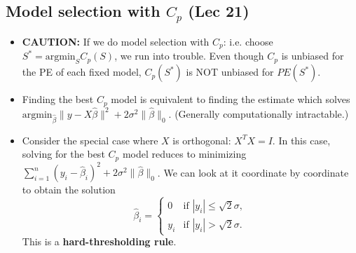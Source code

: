 \documentclass[twoside]{article}
\newcommand\dis{\displaystyle}
\newcommand\sg{\sigma}
\begin{document}
\subsection{Model selection with $C_p$ (Lec 21)}
\begin{itemize}
\item \textbf{CAUTION:} If we do model selection with $C_p$: i.e. choose $S^* = \text{argmin}_S C_p(S)$, we run into trouble. Even though $C_p$ is unbiased for the PE of each fixed model, $C_p(S^*)$ is NOT unbiased for $PE(S^*)$.

\item Finding the best $C_p$ model is equivalent to finding the estimate which solves $\text{argmin}_{\hat{\beta}} \|y - X\hat{\beta} \|^2 + 2\sg^2 \|\hat{\beta}\|_0$. (Generally computationally intractable.)

\item Consider the special case where $X$ is orthogonal: $X^T X = I$. In this case, solving for the best $C_p$ model reduces to minimizing $\dis\sum_{i=1}^n (y_i - \hat{\beta}_i)^2 + 2\sg^2 \|\hat{\beta}\|_0$. We can look at it coordinate by coordinate to obtain the solution
\[ \hat{\beta}_i = \begin{cases} 0 &\text{if } |y_i| \leq \sqrt{2}\sg, \\ y_i &\text{if } |y_i| > \sqrt{2}\sg. \end{cases} \]
This is a \textbf{hard-thresholding rule}.

\end{itemize}
\end{document}
